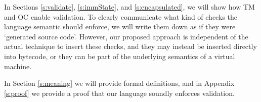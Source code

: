 In Sections \ref{s:validate}, \ref{s:immState}, and \ref{s:encapsulated}, we will show how TM and OC enable validation.
To clearly communicate what kind of checks the language semantic should enforce,
 we will write them down as if they were `generated source code'.
However, our proposed approach is independent of the actual technique to insert these checks, and they may instead be inserted directly into bytecode, or they can be part of the underlying semantics of a virtual machine.

In Section \ref{s:meaning} we will provide formal definitions, and in Appendix \ref{s:proof} we provide  a proof that our language soundly enforces validation.




